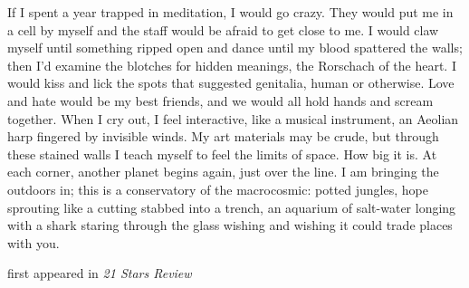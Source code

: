 
If I spent a year trapped in meditation, I would go crazy. They would
put me in a cell by myself and the staff would be afraid to get close to
me. I would claw myself until something ripped open and dance until my
blood spattered the walls; then I'd examine the blotches for hidden
meanings, the Rorschach of the heart. I would kiss and lick the spots
that suggested genitalia, human or otherwise. Love and hate would be my
best friends, and we would all hold hands and scream together. When I
cry out, I feel interactive, like a musical instrument, an Aeolian harp
fingered by invisible winds. My art materials may be crude, but through
these stained walls I teach myself to feel the limits of space. How big
it is. At each corner, another planet begins again, just over the line.
I am bringing the outdoors in; this is a conservatory of the
macrocosmic: potted jungles, hope sprouting like a cutting stabbed into
a trench, an aquarium of salt-water longing with a shark staring through
the glass wishing and wishing it could trade places with you.

first appeared in \emph{21 Stars Review}

